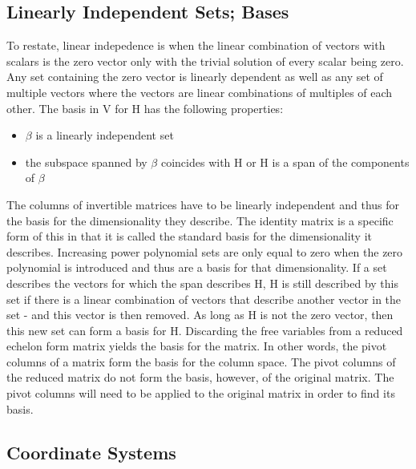 \documentclass[12pt]{article}
\begin{document}
\subsection{Linearly Independent Sets; Bases}
To restate, linear indepedence is when the linear combination of vectors with scalars is the zero vector only with the trivial 
solution of every scalar being zero. Any set containing the zero vector is linearly dependent as well as any set of multiple 
vectors where the vectors are linear combinations of multiples of each other. The basis in V for H has the following properties:
\begin{itemize}
    \item $\beta$ is a linearly independent set
    \item the subspace spanned by $\beta$ coincides with H or H is a span of the components of $\beta$ 
\end{itemize}
The columns of invertible matrices have to be linearly independent and thus for the basis for the dimensionality they describe. The identity 
matrix is a specific form of this in that it is called the standard basis for the dimensionality it describes. Increasing power polynomial 
sets are only equal to zero when the zero polynomial is introduced and thus are a basis for that dimensionality. If a set describes the 
vectors for which the span describes H, H is still described by this set if there is a linear combination of vectors that describe another 
vector in the set - and this vector is then removed. As long as H is not the zero vector, then this new set can form a basis for H. 
Discarding the free variables from a reduced echelon form matrix yields the basis for the matrix. In other words, the pivot columns of 
a matrix form the basis for the column space. The pivot columns of the reduced matrix do not form the basis, however, of the original
matrix. The pivot columns will need to be applied to the original matrix in order to find its basis. 
\subsection{Coordinate Systems}

    
\end{document}
